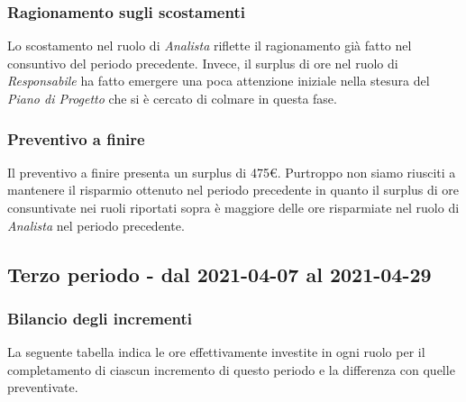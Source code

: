 {{{{{{{{{{		\subsubsection{Ragionamento sugli scostamenti}\label{ConsuntivoSecondoPeriodoDiProgettazioneDiDettaglioCodificaRagionamentoScostamenti}
		Lo scostamento nel ruolo di \textit{Analista} riflette il ragionamento già fatto nel consuntivo del periodo precedente.
		Invece, il surplus di ore nel ruolo di \textit{Responsabile} ha fatto emergere una poca attenzione iniziale nella stesura del \textit{Piano di Progetto} che si è cercato di colmare in questa fase.
		
		\subsubsection{Preventivo a finire}\label{ConsuntivoSecondoPeriodoDiProgettazioneDiDettaglioCodificaPreventivoFinire}
		Il preventivo a finire presenta un surplus di 475\euro. 
		Purtroppo non siamo riusciti a mantenere il risparmio ottenuto nel periodo precedente in quanto il surplus di ore consuntivate nei ruoli riportati sopra è maggiore delle ore risparmiate nel ruolo di \textit{Analista} nel periodo precedente. 
		
\subsection{Terzo periodo - dal 2021-04-07 al 2021-04-29} }\label{ConsuntivoTerzoPeriodoDiProgettazioneDiDettaglioCodifica}

\subsubsection{Bilancio degli incrementi}\label{ConsuntivoTerzoPeriodoDiProgettazioneDiDettaglioCodificaIncrementi}

La seguente tabella indica le ore effettivamente investite in ogni ruolo per il completamento di ciascun incremento di questo periodo e la differenza con quelle preventivate.

\quad
\def\tabularxcolumn#1{m{#1}}
{
	
}}}}}}}}}}
